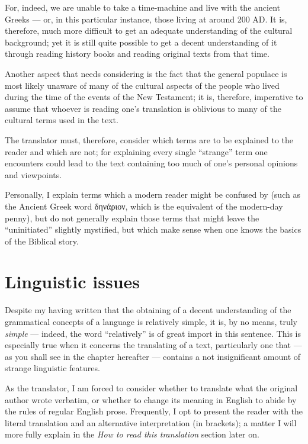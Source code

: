  For, indeed, we are unable to take a time-machine and live with the ancient Greeks — or, in this particular instance, those living at around 200 AD. It is, therefore, much more difficult to get an adequate understanding of the cultural background; yet it is still quite possible to get a decent understanding of it through reading history books and reading original texts from that time.
 
 Another aspect that needs considering is the fact that the general populace is most likely unaware of many of the cultural aspects of the people who lived during the time of the events of the New Testament; it is, therefore, imperative to assume that whoever is reading one's translation is oblivious to many of the cultural terms used in the text.  
 
 The translator must, therefore, consider which terms are to be explained to the reader and which are not; for explaining every single ``strange'' term one encounters could lead to the text containing too much of one's personal opinions and viewpoints. 
 
 Personally, I explain terms which a modern reader might be confused by (such as the Ancient Greek word δηνάριον, which is the equivalent of the modern-day penny), but do not generally explain those terms that might leave the ``uninitiated'' slightly mystified, but which make sense when one knows the basics of the Biblical story.
 
 \section*{Linguistic issues}
  
Despite my having written that the obtaining of a decent understanding of the grammatical concepts of a language is relatively simple, it is, by no means, truly \textit{simple} — indeed, the word ``relatively'' is of great import in this sentence. This is especially true when it concerns the translating of a text, particularly one that — as you shall see in the chapter hereafter — contains a not insignificant amount of strange linguistic features. 

As the translator, I am forced to consider whether to translate what the original author wrote verbatim, or whether to change its meaning in English to abide by the rules of regular English prose. Frequently, I opt to present the reader with the literal translation and an alternative interpretation (in brackets); a matter I will more fully explain in the \textit{How to read this translation} section later on. 

